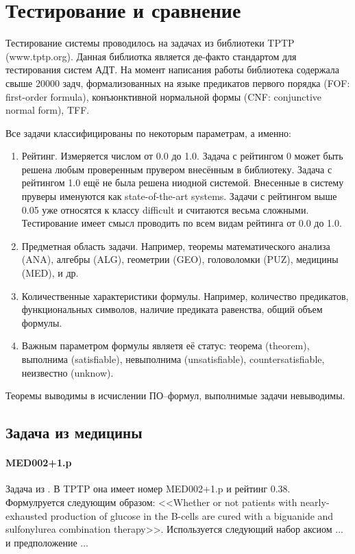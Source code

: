 \section{Тестирование и сравнение}

Тестирование системы проводилось на задачах из библиотеки TPTP (www.tptp.org). Данная библиотка является де-факто стандартом для тестирования систем АДТ. На момент написания работы библиотека содержала свыше 20000 задч, формализованных на языке предикатов первого порядка (FOF: first-order formula), конъюнктивной нормальной формы (CNF: conjunctive normal form), TFF.

Все задачи классифицированы по некоторым параметрам, а именно:
\begin{enumerate}
\item Рейтинг. Измеряется числом от 0.0 до 1.0. Задача с рейтингом 0 может быть решена любым проверенным прувером внесённым в библиотеку. Задача с рейтингом 1.0 ещё не была решена ниодной системой. Внесенные в систему пруверы именуются как state-of-the-art systems. Задачи с рейтингом выше 0.05 уже относятся к классу difficult и считаются весьма сложными. Тестирование имеет смысл проводить по всем видам рейтинга от 0.0 до 1.0.
\item Предметная область задачи. Например, теоремы математического анализа (ANA), алгебры (ALG), геометрии (GEO), головоломки (PUZ), медицины (MED), и др.
\item Количественные характеристики формулы. Например, количество предикатов, функциональных символов, наличие предиката равенства, общий объем формулы.
\item Важным параметром формулы являетя её статус: теорема (theorem), выполнима (satisfiable), невыполнима (unsatisfiable), countersatisfiable, неизвестно (unknow).
\end{enumerate}

Теоремы выводимы в исчислении ПО--формул, выполнимые задачи невыводимы.


\subsection{Задача из медицины}
\paragraph{MED002+1.p}
Задача из \cite{med1}. В TPTP она имеет номер MED002+1.p и рейтинг 0.38.
Формулруется следующим образом: <<Whether or not patients with nearly-exhausted production of glucose in the B-cells are cured with a biguanide and sulfonylurea combination therapy>>. Используется следующий набор аксиом ... и предположение ...

